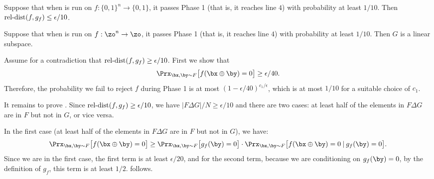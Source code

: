 \documentclass[11pt]{article}
\theoremstyle{definition}
\begin{document}
\begin{lemma}\label{lem:f is close to g conj}
Suppose that when  is run on $f:\{0,1\}^n\rightarrow \{0,1\}$, it passes Phase 1 (that is, it reaches  line $4$) with probability at least $1/10$. Then $\mathrm{rel}\text{-}\mathrm{dist}(f,g_f) \leq \epsilon/10$.
\end{lemma}


\begin{lemma}\label{lem:g is affine}
Suppose that when  is run on $f:\zo^n \to \zo$, it passes Phase 1 (that is, it reaches line ${4}$) with probability at least $1/10$.
 Then $G $ is a linear subspace.
\end{lemma}



\begin{proofof}{}




Assume for a contradiction that  
 $\mathrm{rel}\text{-}\mathrm{dist}(f,g_f) \geq \epsilon/10$.
 First we show that  
\begin{equation}
\label{eq:hehe10}\Prx_{\bx,\by \sim F } \big[f(\bx \oplus \by) =0\big] \geq \epsilon/40.\end{equation}
Therefore,  the probability we fail to reject $f$ during Phase 1 is at most $(1-\epsilon/40)^{c_1/\epsilon}$, which is at most $1/10$ for a suitable choice of $c_1$. 


It remains to prove . Since $\mathrm{rel}\text{-}\mathrm{dist}(f,g_f) \geq \epsilon/10$, we have $|F \Delta G |/N \geq \epsilon/10$ and 
there are two cases: at least half of the elements in $F \Delta G $ are in $F $ but not in $G $, or vice versa. 




In the first case (at least half of the elements in $F \Delta G $ are in $F $ but not in $G $),  we have:
$$\Prx_{\bx,\by \sim F }\big[f(\bx \oplus \by)=0\big] \geq 
\Prx_{\bx, \by \sim F } \big[g_f(\by)=0\big] \cdot \Prx_{\bx,\by \sim F}\big[f(\bx \oplus \by)=0 \hspace{0.08cm}|\hspace{0.08cm} g_f(\by)=0\big].$$
Since we are in the first case, the first term is at least $\epsilon/20$, and for the second term, because we are conditioning on  $g_f(\by)=0$, by the definition of $g_f$, this term is at least $1/2$.  follows.




\end{proofof}
\end{document}
